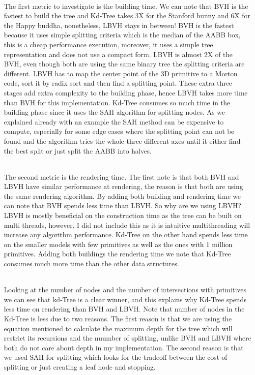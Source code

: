 \documentclass[11pt,a4paper]{article}
\begin{document}
\noindent
\\
The first metric to investigate is the building time. We can note that BVH is the fastest to build the tree and Kd-Tree takes 3X for the Stanford bunny and 6X for the Happy buddha, nonetheless, LBVH stays in between! BVH is the fastest because it uses simple splitting criteria which is the median of the AABB box, this is a cheap performance execution, moreover, it uses a simple tree representation and does not use a compact form. LBVH is almost 2X of the BVH, even though both are using the same binary tree the splitting criteria are different. LBVH has to map the center point of the 3D primitive to a Morton code, sort it by radix sort and then find a splitting point. These extra three stages add extra complexity to the building phase, hence LBVH takes more time than BVH for this implementation. Kd-Tree consumes so much time in the building phase since it uses the SAH algorithm for splitting nodes. As we explained already with an example the SAH method can be expensive to compute, especially for some edge cases where the splitting point can not be found and the algorithm tries the whole three different axes until it either find the best split or just split the AABB into halves. 

\noindent
\\
The second metric is the rendering time.  The first note is that both BVH and LBVH have similar performance at rendering, the reason is that both are using the same rendering algorithm. By adding both building and rendering time we can note that BVH spends less time than LBVH. So why are we using LBVH? LBVH is mostly beneficial on the construction time as the tree can be built on multi threads, however, I did not include this as it is intuitive multithreading will increase any algorithm performance. Kd-Tree on the other hand spends less time on the smaller models with few primitives as well as the ones with 1 million primitives. Adding both buildings the rendering time we note that Kd-Tree consumes much more time than the other data structures. 

\noindent
\\
Looking at the number of nodes and the number of intersections with primitives we can see that kd-Tree is a clear winner, and this explains why Kd-Tree spends less time on rendering than BVH and LBVH. Note that number of nodes in the Kd-Tree is less due to two reasons. The first reason is that we are using the equation mentioned to calculate the maximum depth for the tree which will restrict its recursions and the nuumber of splitting, unlike BVH and LBVH where both do not care about depth in my implementation.  The second reason is that we used SAH for splitting which looks for the tradeoff between the cost of splitting or just creating a leaf node and stopping. 
\end{document}
